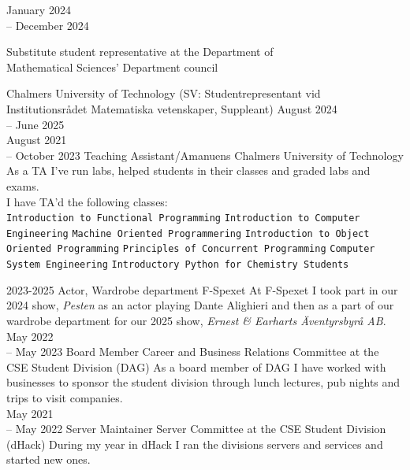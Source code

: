 \documentclass[9pt]{developercv}
\begin{document}
\begin{entrylist}
	\entry
		{January 2024 \\-- December 2024}
		{
			\begin{minipage}[t]{0.5\textwidth}
				Substitute student representative at the Department of \\
				Mathematical Sciences' Department council
			\end{minipage}
		}
		{Chalmers University of Technology}
		{(SV: Studentrepresentant vid Institutionsrådet Matematiska vetenskaper, Suppleant)}
	\entry
		{August 2024 \\-- June 2025\center{+}\\ August 2021 \\-- October 2023}
		{Teaching Assistant/Amanuens}
		{Chalmers University of Technology}
		{
			As a TA I've run labs, helped students in their classes and
			graded labs and exams.\\ I have TA'd the following classes:\\
			\texttt{Introduction to Functional Programming}\slashsep
			\texttt{Introduction to Computer Engineering}\slashsep
			\texttt{Machine Oriented Programmering}\slashsep
			\texttt{Introduction to Object Oriented Programming}\slashsep
			\texttt{Principles of Concurrent Programming}\slashsep
			\texttt{Computer System Engineering}\slashsep
			\texttt{Introductory Python for Chemistry Students}
		}
\end{entrylist}
\begin{entrylist}
	\entry
		{2023-2025}
		{Actor, Wardrobe department}
		{F-Spexet}
		{
			At F-Spexet I took part in our 2024 show,
			\textit{Pesten} as an actor playing Dante
			Alighieri and then as a part of our wardrobe
			department for our 2025 show, \textit{Ernest
			  \& Earharts Äventyrsbyrå AB}.
		}
	\entry
		{May 2022 \\-- May 2023}
		{Board Member}
		{Career and Business Relations Committee at the CSE Student Division (DAG)}
		{
			As a board member of DAG I have worked with
			businesses to sponsor the student division through
			lunch lectures, pub nights and trips to visit
			companies.\\
		}
	\entry
		{May 2021 \\-- May 2022}
		{Server Maintainer}
		{Server Committee at the CSE Student Division (dHack)}
		{
			During my year in dHack I ran the divisions servers and services and started new ones.\\
		}
\end{entrylist}
\hfill\\
\end{document}

